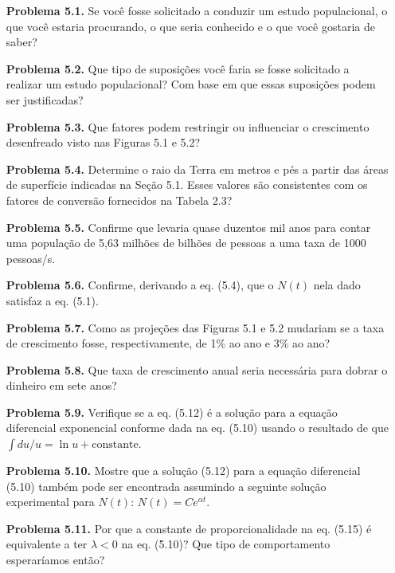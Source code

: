 \begin{enumerate}
    \item[\textbf{Problema 5.1.}] Se você fosse solicitado a conduzir um estudo populacional, o que você estaria procurando, o que seria conhecido e o que você gostaria de saber?

    \item[\textbf{Problema 5.2.}] Que tipo de suposições você faria se fosse solicitado a realizar um estudo populacional? Com base em que essas suposições podem ser justificadas?

    \item[\textbf{Problema 5.3.}] Que fatores podem restringir ou influenciar o crescimento desenfreado visto nas Figuras 5.1 e 5.2?

    \item[\textbf{Problema 5.4.}] Determine o raio da Terra em metros e pés a partir das áreas de superfície indicadas na Seção 5.1. Esses valores são consistentes com os fatores de conversão fornecidos na Tabela 2.3?

    \item[\textbf{Problema 5.5.}] Confirme que levaria quase duzentos mil anos para contar uma população de 5,63 milhões de bilhões de pessoas a uma taxa de 1000 pessoas/s.

    \item[\textbf{Problema 5.6.}] Confirme, derivando a eq. (5.4), que o $N(t)$ nela dado satisfaz a eq. (5.1).

    \item[\textbf{Problema 5.7.}] Como as projeções das Figuras 5.1 e 5.2 mudariam se a taxa de crescimento fosse, respectivamente, de 1\% ao ano e 3\% ao ano?

    \item[\textbf{Problema 5.8.}] Que taxa de crescimento anual seria necessária para dobrar o dinheiro em sete anos?

    \item[\textbf{Problema 5.9.}] Verifique se a eq. (5.12) é a solução para a equação diferencial exponencial conforme dada na eq. (5.10) usando o resultado de que $\int du/u = \ln u + \text{constante}$.

    \item[\textbf{Problema 5.10.}] Mostre que a solução (5.12) para a equação diferencial (5.10) também pode ser encontrada assumindo a seguinte solução experimental para $N(t)$: $N(t) = Ce^{\alpha t}$.

    \item[\textbf{Problema 5.11.}] Por que a constante de proporcionalidade na eq. (5.15) é equivalente a ter $\lambda < 0$ na eq. (5.10)? Que tipo de comportamento esperaríamos então?


\end{enumerate}
